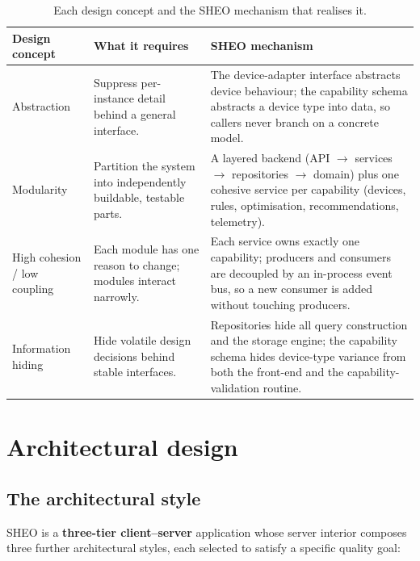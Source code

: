 \begin{table}[htbp]
\centering
\caption{Each design concept and the SHEO mechanism that realises it.}
\label{tab:design-goals}
\begin{tabularx}{\textwidth}{L{0.20\textwidth} Y Y}
\toprule
\textbf{Design concept} & \textbf{What it requires} & \textbf{SHEO mechanism} \\
\midrule
Abstraction &
Suppress per-instance detail behind a general interface. &
The device-adapter interface abstracts device behaviour; the capability
schema abstracts a device type into data, so callers never branch on a concrete
model. \\
Modularity &
Partition the system into independently buildable, testable parts. &
A layered backend (API $\to$ services $\to$ repositories $\to$ domain) plus one
cohesive service per capability (devices, rules, optimisation, recommendations,
telemetry). \\
High cohesion / low coupling &
Each module has one reason to change; modules interact narrowly. &
Each service owns exactly one capability; producers and consumers are decoupled by
an in-process event bus, so a new consumer is added without touching producers. \\
Information hiding &
Hide volatile design decisions behind stable interfaces. &
Repositories hide all query construction and the storage engine; the capability
schema hides device-type variance from both the front-end and the capability-validation routine. \\
\bottomrule
\end{tabularx}
\end{table}

\section{Architectural design}
\label{sec:architecture}

\subsection{The architectural style}

SHEO is a \textbf{three-tier client--server} application whose server interior
composes three further architectural styles, each selected to satisfy
a specific quality goal:

